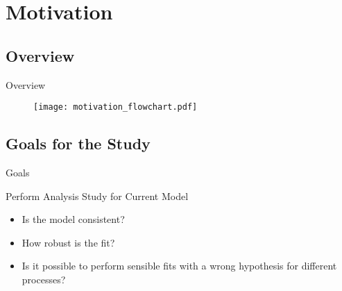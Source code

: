 \section{Motivation}
\subsection{Overview}
\begin{frame}{Overview}
\begin{figure}
\centering

\texttt{[image: motivation\_flowchart.pdf]}
\end{figure}

\end{frame}
\subsection{Goals for the Study}
\begin{frame}{Goals}
\begin{block}{Perform Analysis Study for Current Model}
\begin{itemize}
\item Is the model consistent?
\item How robust is the fit?
\item Is it possible to perform sensible fits with a wrong hypothesis for different processes?
\end{itemize}
\end{block}

\end{frame}